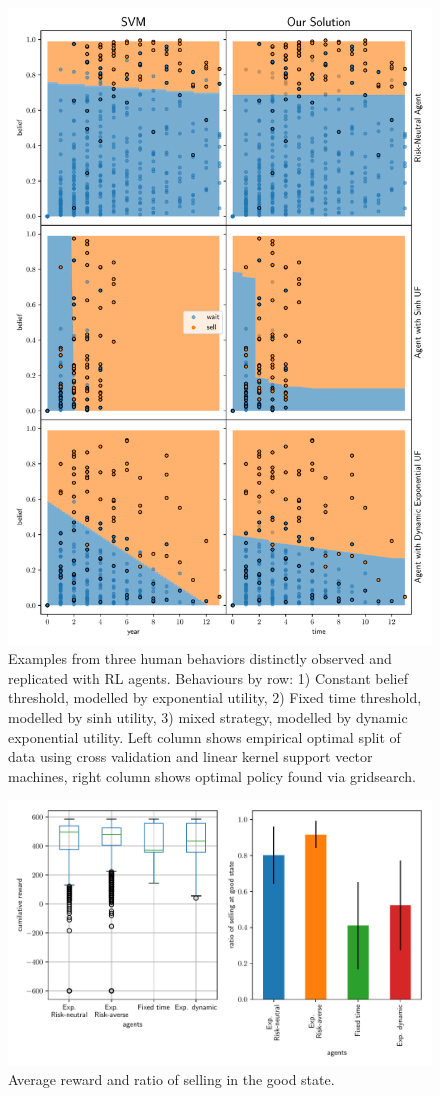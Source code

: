 
\begin{figure}
    \includegraphics[width=0.8\linewidth]{img/fit}
    \caption{Examples from three human behaviors distinctly observed and replicated with RL agents. Behaviours by row: 1) Constant belief threshold, modelled by exponential utility, 2) Fixed time threshold, modelled by sinh utility, 3) mixed strategy, modelled by dynamic exponential utility. Left column shows empirical optimal split of data using cross validation and linear kernel support vector machines, right column shows optimal policy found via gridsearch.}
    \label{fig:svm_vs_value}
\end{figure}


\begin{figure}
\includegraphics[width=0.8\linewidth]{img/performance.pdf}
\caption{Average reward and ratio of selling in the good state.}
\end{figure}
